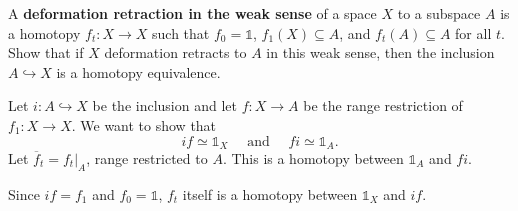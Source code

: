 \question A \textbf{deformation retraction in the weak sense} of a space $X$ to
a subspace $A$ is a homotopy $f_t: X \rightarrow X$ such that $f_0 =
\mathbb{1}$, $f_1(X) \subseteq A$, and $f_t(A) \subseteq A$ for all $t$. Show
that if $X$ deformation retracts to $A$ in this weak sense, then the inclusion
$A \hookrightarrow X$ is a homotopy equivalence.

\begin{solution}
    Let $i: A \hookrightarrow X$ be the inclusion and let $f: X \rightarrow A$ 
    be the range restriction of $f_1:X \rightarrow X$. We want to show that 
    \[ if \simeq \mathbb{1}_X \quad \text{ and } \quad fi \simeq \mathbb{1}_A.
    \]
    Let $\overline{f}_t = f_t\rvert_A$, range restricted to $A$. This is a 
    homotopy between $\mathbb{1}_A$ and $fi$.

    Since $if = f_1$ and $f_0 = \mathbb{1}$, $f_t$ itself is a homotopy between 
    $\mathbb{1}_X$ and $if$.
\end{solution}